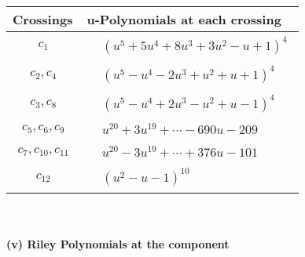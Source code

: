 \documentclass[1p]{elsarticle_modified}
\theoremstyle{definition}
\begin{document}
\begin{tabular}{m{50pt}|m{274pt}}
Crossings & \hspace{64pt}u-Polynomials at each crossing \\
\hline $$\begin{aligned}c_{1}\end{aligned}$$&$\begin{aligned}
&(u^5+5 u^4+8 u^3+3 u^2- u+1)^4
\end{aligned}$\\
\hline $$\begin{aligned}c_{2},c_{4}\end{aligned}$$&$\begin{aligned}
&(u^5- u^4-2 u^3+u^2+u+1)^4
\end{aligned}$\\
\hline $$\begin{aligned}c_{3},c_{8}\end{aligned}$$&$\begin{aligned}
&(u^5- u^4+2 u^3- u^2+u-1)^4
\end{aligned}$\\
\hline $$\begin{aligned}c_{5},c_{6},c_{9}\end{aligned}$$&$\begin{aligned}
&u^{20}+3 u^{19}+\cdots-690 u-209
\end{aligned}$\\
\hline $$\begin{aligned}c_{7},c_{10},c_{11}\end{aligned}$$&$\begin{aligned}
&u^{20}-3 u^{19}+\cdots+376 u-101
\end{aligned}$\\
\hline $$\begin{aligned}c_{12}\end{aligned}$$&$\begin{aligned}
&(u^2- u-1)^{10}
\end{aligned}$\\
\hline
\end{tabular}\\~\\
\newpage\renewcommand{\arraystretch}{1}
\flushleft \textbf{(v) Riley Polynomials at the component}\newline \\
\end{document}

